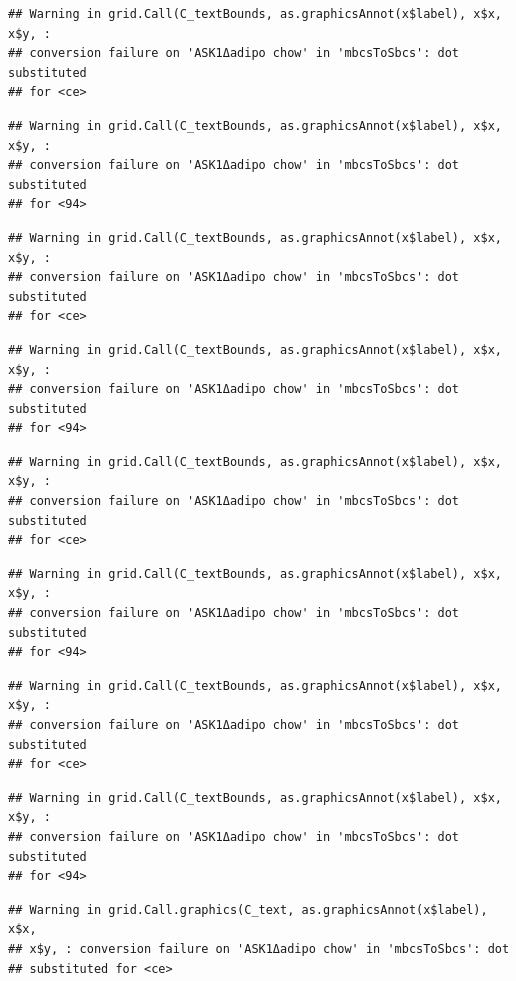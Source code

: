 \documentclass[]{book}
\begin{document}
\begin{verbatim}
## Warning in grid.Call(C_textBounds, as.graphicsAnnot(x$label), x$x, x$y, :
## conversion failure on 'ASK1Δadipo chow' in 'mbcsToSbcs': dot substituted
## for <ce>
\end{verbatim}

\begin{verbatim}
## Warning in grid.Call(C_textBounds, as.graphicsAnnot(x$label), x$x, x$y, :
## conversion failure on 'ASK1Δadipo chow' in 'mbcsToSbcs': dot substituted
## for <94>
\end{verbatim}

\begin{verbatim}
## Warning in grid.Call(C_textBounds, as.graphicsAnnot(x$label), x$x, x$y, :
## conversion failure on 'ASK1Δadipo chow' in 'mbcsToSbcs': dot substituted
## for <ce>
\end{verbatim}

\begin{verbatim}
## Warning in grid.Call(C_textBounds, as.graphicsAnnot(x$label), x$x, x$y, :
## conversion failure on 'ASK1Δadipo chow' in 'mbcsToSbcs': dot substituted
## for <94>
\end{verbatim}

\begin{verbatim}
## Warning in grid.Call(C_textBounds, as.graphicsAnnot(x$label), x$x, x$y, :
## conversion failure on 'ASK1Δadipo chow' in 'mbcsToSbcs': dot substituted
## for <ce>
\end{verbatim}

\begin{verbatim}
## Warning in grid.Call(C_textBounds, as.graphicsAnnot(x$label), x$x, x$y, :
## conversion failure on 'ASK1Δadipo chow' in 'mbcsToSbcs': dot substituted
## for <94>
\end{verbatim}

\begin{verbatim}
## Warning in grid.Call(C_textBounds, as.graphicsAnnot(x$label), x$x, x$y, :
## conversion failure on 'ASK1Δadipo chow' in 'mbcsToSbcs': dot substituted
## for <ce>
\end{verbatim}

\begin{verbatim}
## Warning in grid.Call(C_textBounds, as.graphicsAnnot(x$label), x$x, x$y, :
## conversion failure on 'ASK1Δadipo chow' in 'mbcsToSbcs': dot substituted
## for <94>
\end{verbatim}

\begin{verbatim}
## Warning in grid.Call.graphics(C_text, as.graphicsAnnot(x$label), x$x,
## x$y, : conversion failure on 'ASK1Δadipo chow' in 'mbcsToSbcs': dot
## substituted for <ce>
\end{verbatim}
\end{document}
